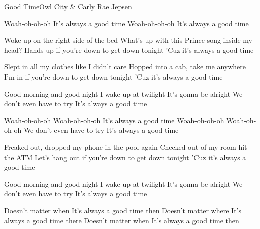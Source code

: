 \documentclass[a4paper,11pt,french]{article}
\begin{document}
\begin{Song}{Good Time}{Owl City \& Carly Rae Jepsen}
\begin{multicols}{2}

\begin{Chorus}
Woah-oh-oh-oh
It's always a good time
Woah-oh-oh-oh
It's always a good time
\end{Chorus}
\espaceInterStrophe

\begin{Verse}
Woke up on the right side of the bed
What's up with this Prince song inside my head?
Hands up if you're down to get down tonight
'Cuz it's always a good time
\espaceInterStrophe

Slept in all my clothes like I didn't care
Hopped into a cab, take me anywhere
I'm in if you're down to get down tonight
'Cuz it's always a good time
\end{Verse}
\espaceInterStrophe

\begin{PreChorus}
Good morning and good night
I wake up at twilight
It's gonna be alright
We don't even have to try
It's always a good time
\end{PreChorus}
\espaceInterStrophe

\begin{Chorus}
Woah-oh-oh-oh Woah-oh-oh-oh
It's always a good time
Woah-oh-oh-oh Woah-oh-oh-oh
We don't even have to try
It's always a good time
\end{Chorus}
\columnbreak

\begin{Verse}
Freaked out, dropped my phone in the pool again
Checked out of my room hit the ATM
Let's hang out if you're down to get down tonight
'Cuz it's always a good time
\end{Verse}
\espaceInterStrophe

\begin{PreChorus}
Good morning and good night
I wake up at twilight
It's gonna be alright
We don't even have to try
It's always a good time
\end{PreChorus}
\espaceInterStrophe

\tochorus[x2]
\espaceInterStrophe

\begin{Bridge}
Doesn't matter when
It's always a good time then
Doesn't matter where
It's always a good time there
Doesn't matter when
It's always a good time then
\end{Bridge}
\espaceInterStrophe

\tochorus\\
\adlib
\vfill
~
\end{multicols}


\end{Song}
\end{document}
